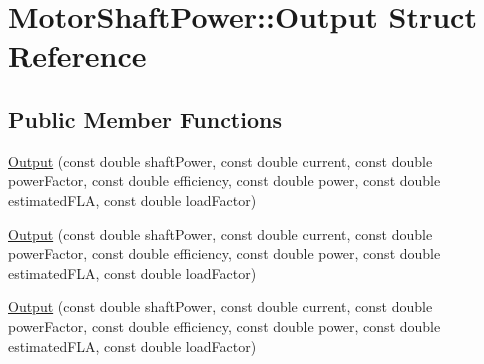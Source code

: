\hypertarget{struct_motor_shaft_power_1_1_output}{}\section{Motor\+Shaft\+Power\+:\+:Output Struct Reference}
\label{struct_motor_shaft_power_1_1_output}
\subsection*{Public Member Functions}
\begin{DoxyCompactItemize}
\item 
\hyperlink{struct_motor_shaft_power_1_1_output_a64e2082ec024a9a20038dd306533bfa7}{Output} (const double shaft\+Power, const double current, const double power\+Factor, const double efficiency, const double power, const double estimated\+F\+LA, const double load\+Factor)
\item 
\hyperlink{struct_motor_shaft_power_1_1_output_a64e2082ec024a9a20038dd306533bfa7}{Output} (const double shaft\+Power, const double current, const double power\+Factor, const double efficiency, const double power, const double estimated\+F\+LA, const double load\+Factor)
\item 
\hyperlink{struct_motor_shaft_power_1_1_output_a64e2082ec024a9a20038dd306533bfa7}{Output} (const double shaft\+Power, const double current, const double power\+Factor, const double efficiency, const double power, const double estimated\+F\+LA, const double load\+Factor)
\end{DoxyCompactItemize}
